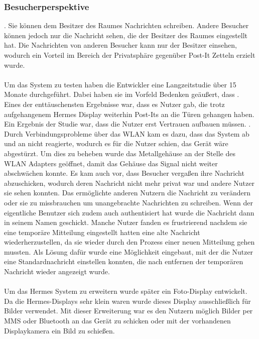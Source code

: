 \subsubsection{Besucherperspektive}
\cite{cheverest:2003:paper}. Sie können dem Besitzer des Raumes Nachrichten schreiben. Andere Besucher können jedoch nur die Nachricht sehen, die der Besitzer des Raumes eingestellt hat. Die Nachrichten von anderen Besucher kann nur der Besitzer einsehen, wodurch ein Vorteil im Bereich der Privatsphäre gegenüber Post-It Zetteln erzielt wurde.
\\
\\
Um das System zu testen haben die Entwickler eine Langzeitstudie über 15 Monate durchgeführt. Dabei haben sie im Vorfeld Bedenken geäußert, dass \cite{cheverest:2003:paper}.
Eines der enttäuschensten Ergebnisse war, dass es Nutzer gab, die trotz aufgehangenem Hermes Display weiterhin Post-Its an die Türen gehangen haben\cite{cheverest:2003:paper}.
Ein Ergebnis der Studie war, dass die Nutzer erst Vertrauen aufbauen müssen. \cite{cheverest:2003:paper}. Durch Verbindungsprobleme über das WLAN kam es dazu, dass das System ab und an nicht reagierte, wodurch es für die Nutzer schien, das Gerät wäre abgestürzt. Um dies zu beheben wurde das Metallgehäuse an der Stelle des WLAN Adapters geöffnet, damit das Gehäuse das Signal nicht weiter abschwächen konnte.
Es kam auch vor, dass Besucher vergaßen ihre Nachricht abzuschicken, wodurch deren Nachricht nicht mehr privat war und andere Nutzer sie sehen konnten. Das ermöglichte anderen Nutzern die Nachricht zu verändern oder sie zu missbrauchen um unangebrachte Nachrichten zu schreiben. Wenn der eigentliche Benutzer sich zudem auch authentisiert hat wurde die Nachricht dann in seinem Namen geschickt\cite{cheverest:2003:article}.
Manche Nutzer fanden es frustrierend nachdem sie eine temporäre Mitteilung eingestellt hatten eine alte Nachricht wiederherzustellen, da sie wieder durch den Prozess einer neuen Mitteilung gehen mussten. Als Lösung dafür wurde eine Möglichkeit eingebaut, mit der die Nutzer eine Standardnachricht einstellen konnten, die nach entfernen der temporären Nachricht wieder angezeigt wurde\cite{cheverest:2003:article}.
\\
\\
Um das Hermes System zu erweitern wurde später ein Foto-Display entwickelt\cite{cheveres:2005:hermes-bluetooth}. Da die Hermes-Displays sehr klein waren wurde dieses Display ausschließlich für Bilder verwendet.
Mit dieser Erweiterung war es den Nutzern möglich Bilder per MMS oder Bluetooth an das Gerät zu schicken oder mit der vorhandenen Displaykamera ein Bild zu schießen.
\\


